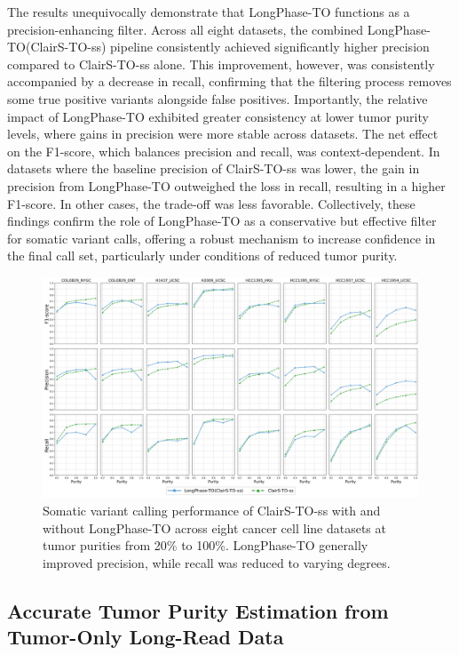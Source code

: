 \documentclass[pdflatex,sn-nature]{sn-jnl}
\def\pandocbounded#1{%
  \begingroup
  \setkeys{Gin}{width=1.0\linewidth,height=1.0\textheight,keepaspectratio}%
  #1%
  \endgroup
}
\begin{document}
The results unequivocally demonstrate that LongPhase-TO functions as a precision-enhancing filter. Across all eight datasets, the combined LongPhase-TO(ClairS-TO-ss) pipeline consistently achieved significantly higher precision compared to ClairS-TO-ss alone. This improvement, however, was consistently accompanied by a decrease in recall, confirming that the filtering process removes some true positive variants alongside false positives. Importantly, the relative impact of LongPhase-TO exhibited greater consistency at lower tumor purity levels, where gains in precision were more stable across datasets. The net effect on the F1-score, which balances precision and recall, was context-dependent. In datasets where the baseline precision of ClairS-TO-ss was lower, the gain in precision from LongPhase-TO outweighed the loss in recall, resulting in a higher F1-score. In other cases, the trade-off was less favorable. Collectively, these findings confirm the role of LongPhase-TO as a conservative but effective filter for somatic variant calls, offering a robust mechanism to increase confidence in the final call set, particularly under conditions of reduced tumor purity.

\begin{figure}
\centering
\pandocbounded{\includegraphics[keepaspectratio]{page_32_cropped.jpg}}
\caption[Somatic variant calling performance with Simulation-Trained]{Somatic variant calling performance of ClairS-TO-ss with and without LongPhase-TO across eight cancer cell line datasets at tumor purities from 20\% to 100\%. LongPhase-TO generally improved precision, while recall was reduced to varying degrees.}
\label{fig:met-page-32-cropped-jpg}
\end{figure}

\subsection{Accurate Tumor Purity Estimation from Tumor-Only Long-Read Data}\label{accurate-tumor-purity-estimation-from-tumor-only-long-read-data}
\end{document}
